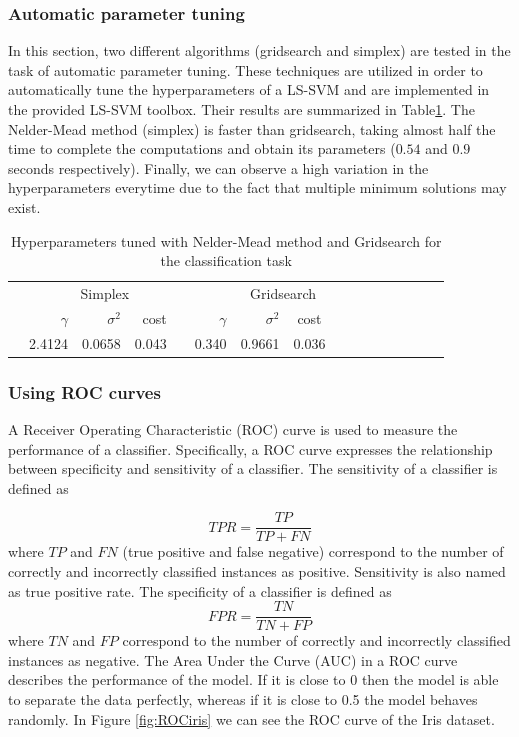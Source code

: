 \documentclass[a4paper, 11pt, one column]{article}
\begin{document}
\subsubsection{Automatic parameter tuning}
In this section, two different algorithms (gridsearch and simplex) are tested in the task of automatic parameter tuning. These techniques are utilized in order to automatically tune the hyperparameters of a LS-SVM and are implemented in the provided LS-SVM toolbox\cite{Brabanter2003LSSVMlabTU}. Their results are summarized in Table\ref{fig:tbl1}. The Nelder-Mead method (simplex) is faster than gridsearch, taking almost half the time to complete the computations and obtain its parameters ($0.54$ and $0.9$ seconds respectively). Finally, we can observe a high variation in the hyperparameters everytime due to the fact that multiple minimum solutions may exist. 

\begin{table}\centering
\begin{tabular}{@{}rrrrrrrccrrrcrrr@{}}\toprule
& \multicolumn{4}{c}{Simplex} & \phantom{abc}& \multicolumn{2}{c}{Gridsearch} &
\phantom{abc} \\
\cmidrule{1-5} \cmidrule{6-9} \cmidrule{10-12}
& $\gamma$ & $\sigma^2$ &     cost &&  $\gamma$ & $\sigma^2$ &    cost \\ \midrule
 &  2.4124 & 0.0658 &  0.043 && 0.340 & 0.9661 & 0.036 \\
\bottomrule
\end{tabular}
\caption{Hyperparameters tuned with Nelder-Mead method and Gridsearch for the classification task}
       \label{fig:tbl1}
\end{table}



\subsubsection{Using ROC curves}
A Receiver Operating Characteristic (ROC) curve is used to measure the performance of a classifier. Specifically, a ROC curve expresses the relationship between specificity and sensitivity of a classifier. The sensitivity of a classifier is defined as 

\begin{equation}
TPR = \frac{TP}{TP+FN}
\end{equation}
where $TP$ and $FN$ (true positive and false negative) correspond to the number of correctly and incorrectly classified instances as positive. Sensitivity is also named as true positive rate.
The specificity of a classifier is defined as 
\begin{equation}
FPR = \frac{TN}{TN+FP}
\end{equation}
where $TN$ and $FP$ correspond to the number of correctly and incorrectly classified instances as negative. The Area Under the Curve (AUC) in a ROC curve describes the performance of the model. If it is close to $0$ then the model is able to separate the data perfectly, whereas if it is close to 0.5 the model behaves randomly. In Figure \ref{fig:ROCiris} we can see the ROC curve of the Iris dataset. 
\end{document}
